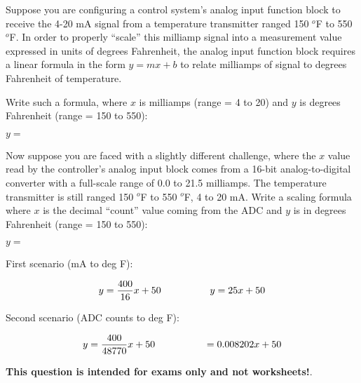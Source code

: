 

Suppose you are configuring a control system's analog input function block to receive the 4-20 mA signal from a temperature transmitter ranged 150 $^{o}$F to 550 $^{o}$F.  In order to properly ``scale'' this milliamp signal into a measurement value expressed in units of degrees Fahrenheit, the analog input function block requires a linear formula in the form $y = mx + b$ to relate milliamps of signal to degrees Fahrenheit of temperature.

\vskip 10pt

Write such a formula, where $x$ is milliamps (range = 4 to 20) and $y$ is degrees Fahrenheit (range = 150 to 550):

\vskip 10pt

$y =$

\vskip 20pt

Now suppose you are faced with a slightly different challenge, where the $x$ value read by the controller's analog input block comes from a 16-bit analog-to-digital converter with a full-scale range of 0.0 to 21.5 milliamps.  The temperature transmitter is still ranged 150 $^{o}$F to 550 $^{o}$F, 4 to 20 mA.  Write a scaling formula where $x$ is the decimal ``count'' value coming from the ADC and $y$ is in degrees Fahrenheit (range = 150 to 550):

\vskip 10pt

$y =$







First scenario (mA to deg F):

$$y = {400 \over 16}x + 50 \hskip 50pt y = 25x + 50$$

\vskip 10pt

Second scenario (ADC counts to deg F):

$$y = {400 \over 48770}x + 50 \hskip 50pt = 0.008202x + 50$$







{\bf This question is intended for exams only and not worksheets!}.



